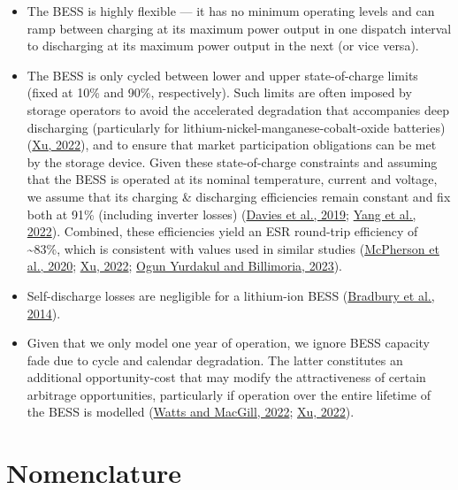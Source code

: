 \documentclass[12pt,a4paper,]{report}
\providecommand{\tightlist}{%
  \setlength{\itemsep}{0pt}\setlength{\parskip}{0pt}}
\begin{document}
\begin{itemize}
\tightlist
\item
  The BESS is highly flexible --- it has no minimum operating levels and
  can ramp between charging at its maximum power output in one dispatch
  interval to discharging at its maximum power output in the next (or
  vice versa).
\item
  The BESS is only cycled between lower and upper state-of-charge limits
  (fixed at 10\% and 90\%, respectively). Such limits are often imposed
  by storage operators to avoid the accelerated degradation that
  accompanies deep discharging (particularly for
  lithium-nickel-manganese-cobalt-oxide batteries)
  (\protect\hyperlink{ref-xuRoleModelingBattery2022}{Xu, 2022}), and to
  ensure that market participation obligations can be met by the storage
  device. Given these state-of-charge constraints and assuming that the
  BESS is operated at its nominal temperature, current and voltage, we
  assume that its charging \& discharging efficiencies remain constant
  and fix both at 91\% (including inverter losses)
  (\protect\hyperlink{ref-daviesCombinedEconomicTechnological2019}{Davies
  et al., 2019};
  \protect\hyperlink{ref-yangModellingOptimalEnergy2022}{Yang et al.,
  2022}). Combined, these efficiencies yield an ESR round-trip
  efficiency of \textasciitilde83\%, which is consistent with values
  used in similar studies
  (\protect\hyperlink{ref-mcphersonImpactsStorageDispatch2020}{McPherson
  et al., 2020}; \protect\hyperlink{ref-xuRoleModelingBattery2022}{Xu,
  2022};
  \protect\hyperlink{ref-yurdakulRiskAverseSelfSchedulingStorage2023}{Ogun
  Yurdakul and Billimoria, 2023}).
\item
  Self-discharge losses are negligible for a lithium-ion BESS
  (\protect\hyperlink{ref-bradburyEconomicViabilityEnergy2014}{Bradbury
  et al., 2014}).
\item
  Given that we only model one year of operation, we ignore BESS
  capacity fade due to cycle and calendar degradation. The latter
  constitutes an additional opportunity-cost that may modify the
  attractiveness of certain arbitrage opportunities, particularly if
  operation over the entire lifetime of the BESS is modelled
  (\protect\hyperlink{ref-wattsEffectsBatteryDegradation2022}{Watts and
  MacGill, 2022}; \protect\hyperlink{ref-xuRoleModelingBattery2022}{Xu,
  2022}).
\end{itemize}

\hypertarget{nomenclature}{%
\section{Nomenclature}\label{nomenclature}}
\end{document}
